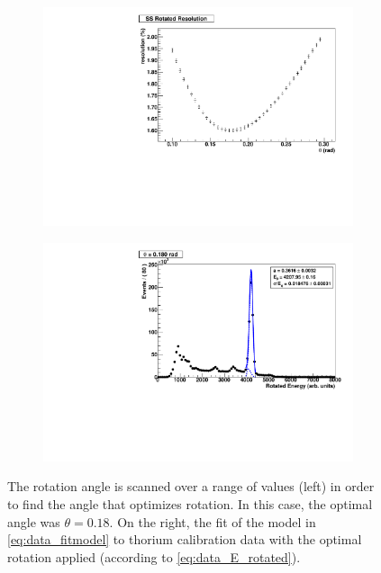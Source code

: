 \documentclass[herrin-thesis.tex]{subfiles}
\begin{document}
\begin{figure}
	\begin{subfigure}[t]{0.48\textwidth}
		\centering
		\includegraphics[width=\textwidth]{./plots/data_finding_theta_scan.pdf}
	\end{subfigure}\hfill%
	\begin{subfigure}[t]{0.48\textwidth}
		\centering
		\includegraphics[width=\textwidth]{./plots/data_finding_theta_best.pdf}
	\end{subfigure}
	\caption[Finding the optimal rotation angle]{The rotation angle is scanned over a range of values (left) in order to find the angle that optimizes rotation. In this case, the optimal angle was \(\theta = 0.18\). On the right, the fit of the model in \cref{eq:data_fitmodel} to thorium calibration data with the optimal rotation applied (according to \cref{eq:data_E_rotated}).}
	\label{fig:data_finding_theta}
\end{figure}
\end{document}
